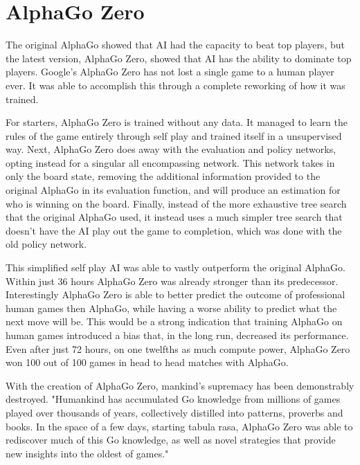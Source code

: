 \documentclass[12pt]{IEEEtran}
\begin{document}
\section{AlphaGo Zero}
The original AlphaGo showed that AI had the capacity to beat top players, but the latest version, AlphaGo Zero, showed that AI has the ability to dominate top players. Google's AlphaGo Zero has not lost a single game to a human player ever. It was able to accomplish this through a complete reworking of how it was trained. 

\par For starters, AlphaGo Zero is trained without any data. It managed to learn the rules of the game entirely through self play and trained itself in a unsupervised way. Next, AlphaGo Zero does away with the evaluation and policy networks, opting instead for a singular all encompassing network. This network takes in only the board state, removing the additional information provided to the original AlphaGo in its evaluation function, and will produce an estimation for who is winning on the board. Finally, instead of the more exhaustive tree search that the original AlphaGo used, it instead uses a much simpler tree search that doesn't have the AI play out the game to completion, which was done with the old policy network.\cite{AlphaZero}

\par This simplified self play AI was able to vastly outperform the original AlphaGo. Within just 36 hours AlphaGo Zero was already stronger than its predecessor. Interestingly AlphaGo Zero is able to better predict the outcome of professional human games then AlphaGo, while having a worse ability to predict what the next move will be. This would be a strong indication that training AlphaGo on human games introduced a bias that, in the long run, decreased its performance. Even after just 72 hours, on one twelfths as much compute power, AlphaGo Zero won 100 out of 100 games in head to head matches with AlphaGo.\cite{AlphaZero}

\par With the creation of AlphaGo Zero, mankind's supremacy has been demonstrably destroyed. "Humankind has accumulated Go knowledge from millions of games played over thousands
of years, collectively distilled into patterns, proverbs and books. In the space of a few days, starting
tabula rasa, AlphaGo Zero was able to rediscover much of this Go knowledge, as well as novel
strategies that provide new insights into the oldest of games."\cite{AlphaZero}
\end{document}
